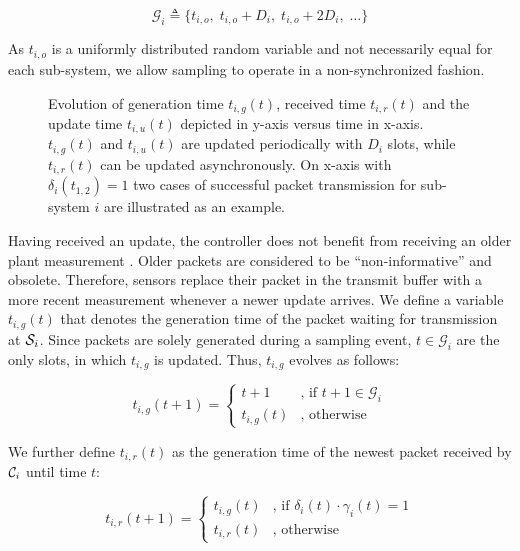 \begin{equation}
  \mathcal{G}_i \triangleq \lbrace t_{i,o}, \; t_{i,o} + D_{i}, \; t_{i,o} + 2 D_{i}, \; \dots \rbrace 
\end{equation}

As $t_{i,o}$ is a uniformly distributed random variable and not necessarily
equal for each sub-system, we allow sampling to operate in a non-synchronized
fashion. 

\begin{figure}[htb]
  \centering
  \resizebox*{.6\textwidth}{!}{} 
  \caption[Example evolution of generation time $t_{i,g}$, received time
  $t_{i,r}$ and update time $t_{i,u}$]{Evolution of generation time
  $t_{i,g}(t)$, received time $t_{i,r}(t)$ and the update time $t_{i,u}(t)$
  depicted in y-axis versus time in x-axis. $t_{i,g}(t)$ and $t_{i,u}(t)$ are
  updated periodically with $D_i$ slots, while $t_{i,r}(t)$ can be updated
  asynchronously. On x-axis with $\delta_i(t_{1,2})=1$ two cases of successful
  packet transmission for sub-system $i$ are illustrated as an example.}
  \label{fig:ageplot}
\end{figure}  

Having received an update, the controller does not benefit from receiving an
older plant measurement \cite{costa2016age}. Older packets are considered to be
``non-informative'' and obsolete. Therefore, sensors replace their packet in the
transmit buffer with a more recent measurement whenever a newer update arrives. We
define a variable $t_{i,g}(t)$ that denotes the generation time of the packet
waiting for transmission at $\mathcal{S}_i$. Since packets are solely generated during
a sampling event, $t \in \mathcal{G}_i$ are the only slots, in which $t_{i,g}$
is updated. Thus, $t_{i,g}$ evolves as follows:

\begin{equation}
  t_{i,g}(t+1) =
  \begin{cases}
  t+1 & \text{, if } t+1 \in \mathcal{G}_i \\
  t_{i,g}(t) & \text{, otherwise}	
  \end{cases}
\end{equation}

We further define $t_{i,r}(t)$ as the generation time of the newest packet
received by $\mathcal{C}_i$ until time $t$:

\begin{equation}
  t_{i, r}(t+1) =
  \begin{cases}
  t_{i, g}(t) & \text{, if } \delta_i(t) \cdot \gamma_i(t) = 1 \\
  t_{i, r}(t) & \text{, otherwise}	
  \end{cases}
\end{equation}

